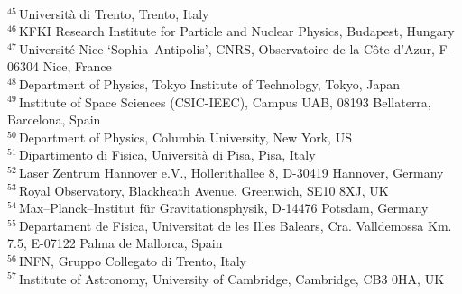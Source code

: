 {\\{$^{45}$\,Universit\`{a} di Trento, Trento, Italy}
\\{$^{46}$\,KFKI Research Institute for Particle and Nuclear Physics, Budapest, Hungary}
\\{$^{47}$\,Universit\'{e} Nice \textquoteleft Sophia--Antipolis\textquoteright, CNRS, Observatoire de la C\^ote d'Azur, F-06304 Nice, France}
\\{$^{48}$\,Department of Physics, Tokyo Institute of Technology, Tokyo, Japan}
\\{$^{49}$\,Institute of Space Sciences (CSIC-IEEC), Campus UAB, 08193 Bellaterra, Barcelona, Spain}
\\{$^{50}$\,Department of Physics, Columbia University, New York, US}
\\{$^{51}$\,Dipartimento di Fisica, Universit\`{a} di Pisa, Pisa, Italy}
\\{$^{52}$\,Laser Zentrum Hannover e.V., Hollerithallee 8, D-30419 Hannover, Germany}
\\{$^{53}$\,Royal Observatory, Blackheath Avenue, Greenwich, SE10 8XJ, UK}
\\{$^{54}$\,Max--Planck--Institut f\"{u}r Gravitationsphysik, D-14476 Potsdam, Germany}
\\{$^{55}$\,Departament de Fisica, Universitat de les Illes Balears, Cra. 
Valldemossa Km. 7.5, E-07122 Palma de Mallorca, Spain}
\\{$^{56}$\,INFN, Gruppo Collegato di Trento, Italy}
\\{$^{57}$\,Institute of Astronomy, University of Cambridge, Cambridge, CB3 0HA, UK}
}

%
